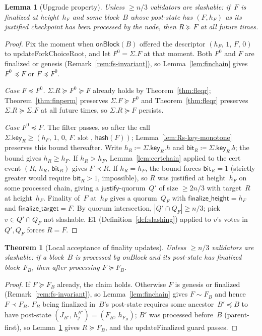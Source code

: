 \documentclass{article}
\newcommand{\slot}[0]{\ensuremath{\operatorname{\mathrm{slot}}}}
\newcommand{\just}{\ensuremath{\mathsf{justify}}\xspace}
\newcommand{\finalizeHeight}{\mathsf{finalize\_height}}
\newcommand{\finalizeTarget}{\mathsf{finalize\_target}}
\newcommand{\hash}{\mathsf{hash}}
\newcommand{\key}{\mathsf{key}}
\newcommand{\bit}{\mathsf{bit}}
\newcommand{\onBlock}{\textsf{onBlock}\xspace}
\newcommand{\updateForkChoiceRoot}{\textsf{updateForkChoiceRoot}\xspace}
\newcommand{\updateFinalized}{\textsf{updateFinalized}\xspace}
\theoremstyle{plain}
\newtheorem{theorem}{Theorem}
\newtheorem{lemma}{Lemma}
\theoremstyle{definition}
\theoremstyle{remark}
\begin{document}
\begin{lemma}[Upgrade property]\label{lem:upgrade}
Unless $\geq n/3$ validators are slashable: if~$F$ is finalized at height~$h_F$ and some block~$B$ whose post-state has $(F, h_F)$ as its justified checkpoint has been processed by the node, then $R \succeq F$ at all future times.
\end{lemma}

\begin{proof}
Fix the moment when $\onBlock(B)$ offered the descriptor $(h_F,\, 1,\, F,\, 0)$ to \updateForkChoiceRoot, and let $F^0 = \Sigma.F$ at that moment.
Both $F^0$ and $F$ are finalized or genesis (Remark~\ref{rem:fs-invariant}), so Lemma~\ref{lem:finchain} gives $F^0 \preceq F$ or $F \preceq F^0$.

\emph{Case $F \preceq F^0$.}
$\Sigma.R \succeq F^0 \succeq F$ already holds by Theorem~\ref{thm:fleqr}; Theorem~\ref{thm:finperm} preserves $\Sigma.F \succeq F^0$ and Theorem~\ref{thm:fleqr} preserves $\Sigma.R \succeq \Sigma.F$ at all future times, so $\Sigma.R \succeq F$ persists.

\emph{Case $F^0 \preceq F$.}
The filter passes, so after the call $\Sigma.\key_R \geq (h_F,\, 1,\, 0,\, F.\slot,\, \hash(F))$; Lemma~\ref{lem:Rs-key-monotone} preserves this bound thereafter.
Write $h_R \coloneqq \Sigma.\key_R.h$ and $\bit_R \coloneqq \Sigma.\key_R.b$; the bound gives $h_R \geq h_F$.
If $h_R > h_F$, Lemma~\ref{lem:certchain} applied to the cert event $(R,\, h_R,\, \bit_R)$ gives $F \prec R$.
If $h_R = h_F$, the bound forces $\bit_R = 1$ (strictly greater would require $\bit_R > 1$, impossible), so $R$ was justified at height~$h_F$ on some processed chain, giving a \just-quorum~$Q'$ of size $\geq 2n/3$ with target~$R$ at height~$h_F$.
Finality of~$F$ at~$h_F$ gives a quorum~$Q_F$ with $\finalizeHeight = h_F$ and $\finalizeTarget = F$.
By quorum intersection, $|Q' \cap Q_F| \geq n/3$; pick $v \in Q' \cap Q_F$ not slashable.
E1 (Definition~\ref{def:slashing}) applied to $v$'s votes in~$Q', Q_F$ forces $R = F$.
\end{proof}

\begin{theorem}[Local acceptance of finality updates]\label{thm:finlive}
Unless $\geq n/3$ validators are slashable: if a block~$B$ is processed by \onBlock and its post-state has finalized block~$F_B$, then after processing $F \succeq F_B$.
\end{theorem}

\begin{proof}
If $F \succeq F_B$ already, the claim holds.
Otherwise $F$ is genesis or finalized (Remark~\ref{rem:fs-invariant}), so Lemma~\ref{lem:finchain} gives $F \sim F_B$ and hence $F \prec F_B$.
$F_B$ being finalized in~$B$'s post-state requires some ancestor~$B' \preceq B$ to have post-state $(J_{B'},\, h_j^{B'}) = (F_B,\, h_{F_B})$; $B'$ was processed before~$B$ (parent-first), so Lemma~\ref{lem:upgrade} gives $R \succeq F_B$, and the \updateFinalized guard passes.
\end{proof}
\end{document}
